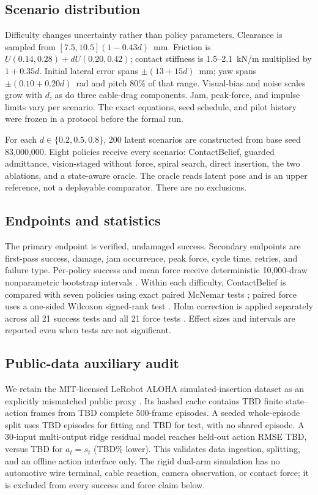 \documentclass[journal]{IEEEtran}
\newcommand{\PublicEpisodes}{TBD}
\newcommand{\PublicFrames}{TBD}
\newcommand{\PublicTrainEpisodes}{TBD}
\newcommand{\PublicTestEpisodes}{TBD}
\newcommand{\PublicRidgeRMSE}{TBD}
\newcommand{\PublicIdentityRMSE}{TBD}
\newcommand{\PublicRMSEGain}{TBD}
\begin{document}
\subsection{Scenario distribution}

Difficulty changes uncertainty rather than policy parameters.  Clearance is
sampled from $[7.5,10.5](1-0.43d)$~mm.  Friction is
$U(0.14,0.28)+dU(0.20,0.42)$; contact stiffness is 1.5--2.1~kN/m multiplied by
$1+0.35d$.  Initial lateral error spans
$\pm(13+15d)$~mm; yaw spans $\pm(0.10+0.20d)$~rad and pitch 80\% of that range.
Visual-bias and noise scales grow with $d$, as do three cable-drag components.
Jam, peak-force, and impulse limits vary per scenario.  The exact equations,
seed schedule, and pilot history were frozen in a protocol before the formal
run.

For each $d\in\{0.2,0.5,0.8\}$, 200 latent scenarios are constructed from base
seed 83,000,000.  Eight policies receive every scenario: ContactBelief, guarded
admittance, vision-staged without force, spiral search, direct insertion, the
two ablations, and a state-aware oracle.  The oracle reads latent pose and is an
upper reference, not a deployable comparator.  There are no exclusions.

\subsection{Endpoints and statistics}

The primary endpoint is verified, undamaged success.  Secondary endpoints are
first-pass success, damage, jam occurrence, peak force, cycle time, retries, and
failure type.  Per-policy success and mean force receive deterministic
10,000-draw nonparametric bootstrap intervals \cite{efron1979bootstrap}.
Within each difficulty, ContactBelief is compared with seven policies using
exact paired McNemar tests \cite{mcnemar1947sampling}; paired force uses a
one-sided Wilcoxon signed-rank test \cite{wilcoxon1945individual}.  Holm
correction is applied separately across all 21 success tests and all 21 force
tests \cite{holm1979simple}.  Effect sizes and intervals are reported even when
tests are not significant.

\subsection{Public-data auxiliary audit}

We retain the MIT-licensed LeRobot ALOHA simulated-insertion dataset as an
explicitly mismatched public proxy \cite{lerobotAlohaDataset}.  Its hashed cache
contains \PublicFrames{} finite state--action frames from \PublicEpisodes{}
complete 500-frame episodes.  A seeded whole-episode split uses
\PublicTrainEpisodes{} episodes for fitting and \PublicTestEpisodes{} for test,
with no shared episode.  A 30-input multi-output ridge residual model reaches
held-out action RMSE \PublicRidgeRMSE{}, versus \PublicIdentityRMSE{} for
$a_t=s_t$ (\PublicRMSEGain\% lower).  This validates data ingestion, splitting,
and an offline action interface only.  The rigid dual-arm simulation has no
automotive wire terminal, cable reaction, camera observation, or contact force;
it is excluded from every success and force claim below.
\end{document}
